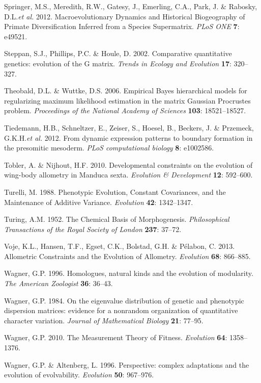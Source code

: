 \documentclass[12pt,twoside]{report}
\begin{document}
Springer, M.S., Meredith, R.W., Gatesy, J., Emerling, C.A., Park, J. \&
Rabosky, D.L.\emph{et al.} 2012. Macroevolutionary Dynamics and
Historical Biogeography of Primate Diversification Inferred from a
Species Supermatrix. \emph{PLoS ONE} \textbf{7}: e49521.

Steppan, S.J., Phillips, P.C. \& Houle, D. 2002. Comparative
quantitative genetics: evolution of the G matrix. \emph{Trends in
Ecology and Evolution} \textbf{17}: 320--327.

Theobald, D.L. \& Wuttke, D.S. 2006. Empirical Bayes hierarchical models
for regularizing maximum likelihood estimation in the matrix Gaussian
Procrustes problem. \emph{Proceedings of the National Academy of
Sciences} \textbf{103}: 18521--18527.

Tiedemann, H.B., Schneltzer, E., Zeiser, S., Hoesel, B., Beckers, J. \&
Przemeck, G.K.H.\emph{et al.} 2012. From dynamic expression patterns to
boundary formation in the presomitic mesoderm. \emph{PLoS computational
biology} \textbf{8}: e1002586.

Tobler, A. \& Nijhout, H.F. 2010. Developmental constraints on the
evolution of wing-body allometry in Manduca sexta. \emph{Evolution \&
Development} \textbf{12}: 592--600.

Turelli, M. 1988. Phenotypic Evolution, Constant Covariances, and the
Maintenance of Additive Variance. \emph{Evolution} \textbf{42}:
1342--1347.

Turing, A.M. 1952. The Chemical Basis of Morphogenesis.
\emph{Philosophical Transactions of the Royal Society of London}
\textbf{237}: 37--72.

Voje, K.L., Hansen, T.F., Egset, C.K., Bolstad, G.H. \& Pélabon, C.
2013. Allometric Constraints and the Evolution of Allometry.
\emph{Evolution} \textbf{68}: 866--885.

Wagner, G.P. 1996. Homologues, natural kinds and the evolution of
modularity. \emph{The American Zoologist} \textbf{36}: 36--43.

Wagner, G.P. 1984. On the eigenvalue distribution of genetic and
phenotypic dispersion matrices: evidence for a nonrandom organization of
quantitative character variation. \emph{Journal of Mathematical Biology}
\textbf{21}: 77--95.

Wagner, G.P. 2010. The Measurement Theory of Fitness. \emph{Evolution}
\textbf{64}: 1358--1376.

Wagner, G.P. \& Altenberg, L. 1996. Perspective: complex adaptations and
the evolution of evolvability. \emph{Evolution} \textbf{50}: 967--976.
\end{document}
